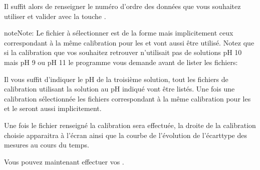 \documentclass[letterpaper,10pt,french]{sphinxmanual}
\begin{document}
\sphinxAtStartPar
Il suffit alors de renseigner le numéro d’ordre des données que vous souhaitez utiliser et valider avec la touche .

\begin{sphinxadmonition}{note}{Note:}
\sphinxAtStartPar
Le fichier à sélectionner est de la forme  mais implicitement
ceux correspondant à la même calibration pour les  et  vont aussi être utilisé. Notez que si la calibration que vos souhaitez
retrouver n’utilisait pas de solutions pH 10 mais pH 9 ou pH 11 le programme vous demande avant de lister les fichiers:

\begin{sphinxVerbatim}[commandchars=\\\{\}]
  
\end{sphinxVerbatim}

\sphinxAtStartPar
Il vous suffit d’indiquer le pH de la troisième solution, tout les fichiers de calibration utilisant la solution au pH indiqué vont être listés. Une fois une
calibration sélectionnée les fichiers correspondant à la même calibration pour les  et  le seront aussi implicitement.
\end{sphinxadmonition}

\sphinxAtStartPar
Une fois le fichier renseigné la calibration sera effectuée, la droite de la calibration choisie apparaitra à
l’écran ainsi que la courbe de l’évolution de l’écart\sphinxhyphen{}type des mesures au cours du temps.

\noindent{}

\sphinxAtStartPar
Vous pouvez maintenant effectuer vos {\hyperref[\detokenize{mesure:mesure}]{}}.
\end{document}
